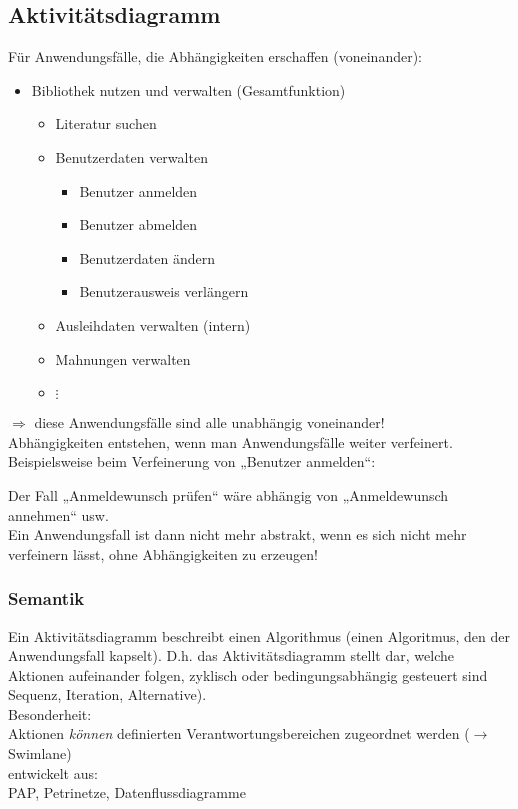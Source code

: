 \documentclass{scrreprt}
\begin{document}
\subsection{Aktivitätsdiagramm}
Für Anwendungsfälle, die Abhängigkeiten erschaffen (voneinander):
\begin{itemize}
\item Bibliothek nutzen und verwalten (Gesamtfunktion)
\begin{itemize}
\item Literatur suchen
\item Benutzerdaten verwalten
\begin{itemize}
\item Benutzer anmelden
\item Benutzer abmelden
\item Benutzerdaten ändern
\item Benutzerausweis verlängern
\end{itemize}
\item Ausleihdaten verwalten (intern)
\item Mahnungen verwalten
\item[] $\vdots$
\end{itemize}
\end{itemize}
$\Rightarrow$ diese Anwendungsfälle sind alle unabhängig voneinander!\\
Abhängigkeiten entstehen, wenn man Anwendungsfälle weiter verfeinert. Beispielsweise beim Verfeinerung von „Benutzer anmelden“: 

Der Fall „Anmeldewunsch prüfen“ wäre abhängig von „Anmeldewunsch annehmen“ usw.\\
Ein Anwendungsfall ist dann nicht mehr abstrakt, wenn es sich nicht mehr verfeinern lässt, ohne Abhängigkeiten zu erzeugen!

\subsubsection{Semantik}
Ein Aktivitätsdiagramm beschreibt einen Algorithmus (einen Algoritmus, den der Anwendungsfall kapselt). D.h. das Aktivitätsdiagramm stellt dar, welche Aktionen aufeinander folgen, zyklisch oder bedingungsabhängig gesteuert sind Sequenz, Iteration, Alternative).\\
Besonderheit: \\
Aktionen \emph{können} definierten Verantwortungsbereichen zugeordnet werden ($\to$ Swimlane)\\
entwickelt aus:\\
PAP, Petrinetze, Datenflussdiagramme
\end{document}
